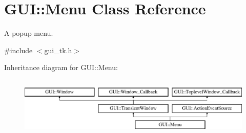 \hypertarget{classGUI_1_1Menu}{\section{G\-U\-I\-:\-:Menu Class Reference}
\label{classGUI_1_1Menu}
}


A popup menu.  




{\ttfamily \#include $<$gui\-\_\-tk.\-h$>$}

Inheritance diagram for G\-U\-I\-:\-:Menu\-:\begin{figure}[H]
\begin{center}
\leavevmode
\includegraphics[height=2.886598cm]{classGUI_1_1Menu}
\end{center}
\end{figure}
